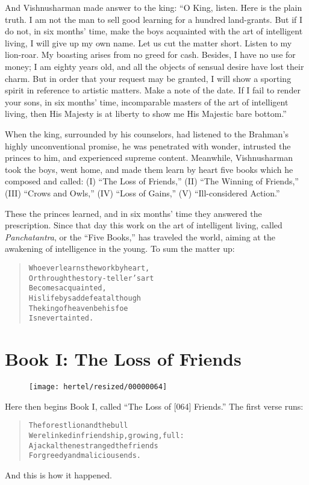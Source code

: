 \documentclass[article, twoside, 10pt]{memoir}
\renewenvironment{verbatim}{%
\begin{quote}%
\vskip -10pt%
\begin{alltt}\normalfont\small}{\end{alltt}%
\end{quote}%
\vskip -10pt
} %
\begin{document}
And Vishnusharman made answer to the king:
``O King, listen. Here is the plain truth. I am not the man to sell good learning for a hundred land-grants. But if I do not, in six months' time, make the boys acquainted with the art of intelligent living, I will give up my own name. Let us cut the matter short. Listen to my lion-roar. My boasting arises from no greed for cash. Besides, I have no use for money; I am eighty years old, and all the objects of sensual desire have lost their charm. But in order that your request may be granted, I will show a sporting spirit in reference to artistic matters. Make a note of the date. If I fail to render your sons, in six months' time, incomparable masters of the art of intelligent living, then His Majesty is at liberty to show me His Majestic bare bottom.''

When the king, surrounded by his counselors, had listened to the
Brahman's highly unconventional promise, he was penetrated with
wonder, intrusted the princes to him, and experienced supreme
content. Meanwhile, Vishnusharman took the boys, went home, and
made them learn by heart five books which he composed and called:
(I) ``The Loss of Friends,'' (II) ``The Winning of Friends,'' (III)
``Crows and Owls,'' (IV) ``Loss of Gains,'' (V)
``Ill-considered Action.''

These the princes learned, and in six months' time they answered
the prescription. Since that day this work on the art of
intelligent living, called \emph{Panchatantra}, or the
``Five Books,'' has traveled the world, aiming at the awakening of
intelligence in the young. To sum the matter up:

\begin{verbatim}
Whoever learns the work by heart,
Or through the story-teller's art
    Becomes acquainted,
His life by sad defeat{\textemdash}although
The king of heaven be his foe{\textemdash}
    Is never tainted.
\end{verbatim}
\part{Book I: The Loss of Friends}

\begin{figure}[p]\texttt{[image: hertel/resized/00000064]}\end{figure}Here then begins Book I, called ``The Loss of [064] Friends.'' The
first verse runs:

\begin{verbatim}
The forest lion and the bull
Were linked in friendship, growing, full:
A jackal then estranged the friends
For greedy and malicious ends.
\end{verbatim}
And this is how it happened.
\end{document}
